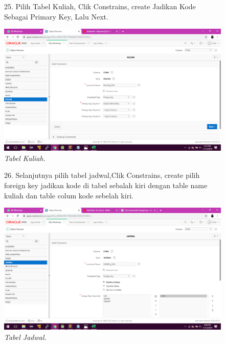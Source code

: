 \begin{enumerate}
\begin{figure}
\item[25.]Pilih Tabel Kuliah, Clik Constrains, create Jadikan Kode Sebagai Primary Key, Lalu Next. 
    \begin{center}
    \includegraphics[scale=0.3]{figures/43.png}
    \caption{\textit{Tabel Kuliah.}}
    \end{center}
    \label{gambar}
    \end{figure}

\begin{figure}
\item[26.]Selanjutnya pilih tabel jadwal,Clik Constrains, create pilih foreign key jadikan kode di tabel sebalah kiri dengan table name kuliah dan table colum kode sebelah kiri.
    \begin{center}
    \includegraphics[scale=0.3]{figures/48.png}
    \caption{\textit{Tabel Jadwal.}}
    \end{center}
    \label{gambar}
    \end{figure}
    

\end{enumerate}
